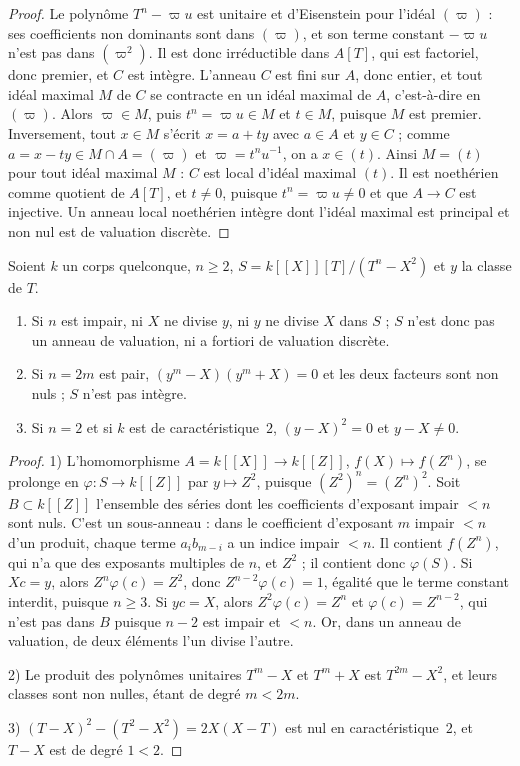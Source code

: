 \begin{proof}
Le polynôme $T^n - \varpi u$ est unitaire et d'Eisenstein pour l'idéal $(\varpi)$ : ses coefficients non dominants sont dans $(\varpi)$, et son terme constant $-\varpi u$ n'est pas dans $(\varpi^2)$. Il est donc irréductible dans $A[T]$, qui est factoriel, donc premier, et $C$ est intègre. L'anneau $C$ est fini sur $A$, donc entier, et tout idéal maximal $M$ de $C$ se contracte en un idéal maximal de $A$, c'est-à-dire en $(\varpi)$. Alors $\varpi \in M$, puis $t^n = \varpi u \in M$ et $t \in M$, puisque $M$ est premier. Inversement, tout $x \in M$ s'écrit $x = a + t y$ avec $a \in A$ et $y \in C$ ; comme $a = x - ty \in M \cap A = (\varpi)$ et $\varpi = t^n u^{-1}$, on a $x \in (t)$. Ainsi $M = (t)$ pour tout idéal maximal $M$ : $C$ est local d'idéal maximal $(t)$. Il est noethérien comme quotient de $A[T]$, et $t \neq 0$, puisque $t^n = \varpi u \neq 0$ et que $A \to C$ est injective. Un anneau local noethérien intègre dont l'idéal maximal est principal et non nul est de valuation discrète.
\end{proof}

\begin{enonce}[Page 26, le cusp $T^n = X^2$]\label{prop:40-cusp}
Soient $k$ un corps quelconque, $n \geq 2$, $S = k[[X]][T]/(T^n - X^2)$ et $y$ la classe de $T$.
\begin{enumerate}
\item Si $n$ est impair, ni $X$ ne divise $y$, ni $y$ ne divise $X$ dans $S$ ; $S$ n'est donc pas un anneau de valuation, ni a fortiori de valuation discrète.
\item Si $n = 2m$ est pair, $(y^m - X)(y^m + X) = 0$ et les deux facteurs sont non nuls ; $S$ n'est pas intègre.
\item Si $n = 2$ et si $k$ est de caractéristique~$2$, $(y - X)^2 = 0$ et $y - X \neq 0$.
\end{enumerate}
\end{enonce}

\begin{proof}
1) L'homomorphisme $A = k[[X]] \to k[[Z]]$, $f(X) \mapsto f(Z^n)$, se prolonge en $\varphi : S \to k[[Z]]$ par $y \mapsto Z^2$, puisque $(Z^2)^n = (Z^n)^2$. Soit $B \subset k[[Z]]$ l'ensemble des séries dont les coefficients d'exposant impair $< n$ sont nuls. C'est un sous-anneau : dans le coefficient d'exposant $m$ impair $< n$ d'un produit, chaque terme $a_i b_{m-i}$ a un indice impair $< n$. Il contient $f(Z^n)$, qui n'a que des exposants multiples de $n$, et $Z^2$ ; il contient donc $\varphi(S)$. Si $Xc = y$, alors $Z^n \varphi(c) = Z^2$, donc $Z^{n-2}\varphi(c) = 1$, égalité que le terme constant interdit, puisque $n \geq 3$. Si $yc = X$, alors $Z^2 \varphi(c) = Z^n$ et $\varphi(c) = Z^{n-2}$, qui n'est pas dans $B$ puisque $n - 2$ est impair et $< n$. Or, dans un anneau de valuation, de deux éléments l'un divise l'autre.

2) Le produit des polynômes unitaires $T^m - X$ et $T^m + X$ est $T^{2m} - X^2$, et leurs classes sont non nulles, étant de degré $m < 2m$.

3) $(T - X)^2 - (T^2 - X^2) = 2X(X - T)$ est nul en caractéristique~$2$, et $T - X$ est de degré $1 < 2$.
\end{proof}

